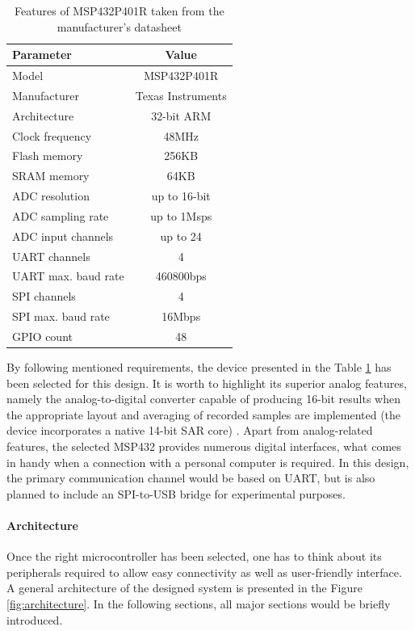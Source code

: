 \documentclass[12pt,a4paper]{article}
\begin{document}
\begin{table}[ht!]
\begin{tabular}{|l|c|}
\hline
\textbf{Parameter}	& \textbf{Value} 	\\ \hline
Model  				& MSP432P401R       \\ \hline
Manufacturer    	& Texas Instruments	\\ \hline
Architecture       	&  32-bit ARM 		\\ \hline
Clock frequency     &  48MHz			\\ \hline
Flash memory        &  256KB			\\ \hline
SRAM memory         &  64KB				\\ \hline
ADC resolution 		&  up to 16-bit		\\ \hline
ADC sampling rate 	&  up to 1Msps 		\\ \hline
ADC input channels 	&  up to 24  		\\ \hline
UART channels 		&  4 				\\ \hline
UART max. baud rate &  460800bps 		\\ \hline
SPI channels 		&  4 				\\ \hline
SPI max. baud rate &  16Mbps 			\\ \hline
GPIO count			& 48				\\ \hline
\end{tabular}
\caption{Features of MSP432P401R taken from the manufacturer's datasheet \cite{msp432_params}}
\label{tab:MSP432_params}
\end{table}

\par
By following mentioned requirements, the device presented in the Table \ref{tab:MSP432_params} has been selected for this design. It is worth to highlight its superior analog features, namely the analog-to-digital converter capable of producing 16-bit results when the appropriate layout and averaging of recorded samples are implemented (the device incorporates a native 14-bit SAR core) \cite{16bit}. Apart from analog-related features, the selected MSP432 provides numerous digital interfaces, what comes in handy when a connection with a personal computer is required. In this design, the primary communication channel would be based on UART, but is also planned to include an SPI-to-USB bridge for experimental purposes.
\par

\paragraph{Architecture}
Once the right microcontroller has been selected, one has to think about its peripherals required to allow easy connectivity as well as user-friendly interface. A general architecture of the designed system is presented in the Figure \ref{fig:architecture}. In the following sections, all major sections would be briefly introduced.
\end{document}
